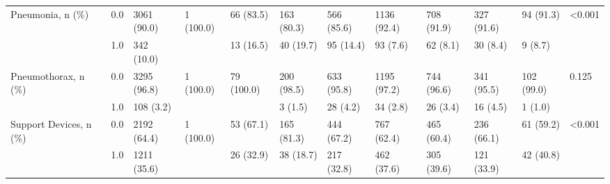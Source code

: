 \begin{tabular}{llllllllllll}
Pneumonia, n (\%) & 0.0 &           3061 (90.0) &  1 (100.0) &   66 (83.5) &  163 (80.3) &  566 (85.6) &  1136 (92.4) &  708 (91.9) &  327 (91.6) &    94 (91.3) &  <0.001 \\
                       & 1.0 &            342 (10.0) &            &   13 (16.5) &   40 (19.7) &   95 (14.4) &     93 (7.6) &    62 (8.1) &    30 (8.4) &      9 (8.7) &         \\
Pneumothorax, n (\%) & 0.0 &           3295 (96.8) &  1 (100.0) &  79 (100.0) &  200 (98.5) &  633 (95.8) &  1195 (97.2) &  744 (96.6) &  341 (95.5) &   102 (99.0) &   0.125 \\
                       & 1.0 &             108 (3.2) &            &             &     3 (1.5) &    28 (4.2) &     34 (2.8) &    26 (3.4) &    16 (4.5) &      1 (1.0) &         \\
Support Devices, n (\%) & 0.0 &           2192 (64.4) &  1 (100.0) &   53 (67.1) &  165 (81.3) &  444 (67.2) &   767 (62.4) &  465 (60.4) &  236 (66.1) &    61 (59.2) &  <0.001 \\
                       & 1.0 &           1211 (35.6) &            &   26 (32.9) &   38 (18.7) &  217 (32.8) &   462 (37.6) &  305 (39.6) &  121 (33.9) &    42 (40.8) &         \\
\bottomrule
\end{tabular}

